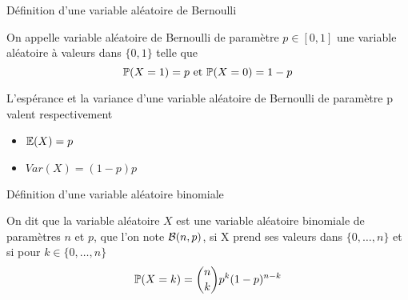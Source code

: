 


\begin{note}
  \begin{field}
    Définition d'une variable aléatoire de Bernoulli
  \end{field}
  \begin{field}
    On appelle variable aléatoire de Bernoulli de paramètre $p \in
    [0,1]$ une variable aléatoire à valeurs dans $\{0,1\}$ telle que
    $$\mathbb{P}(X=1)=p\text{ et }\mathbb{P}(X=0)=1-p$$
  \end{field}
  \begin{field}
  \end{field}
\end{note}


\begin{note}
  \begin{field}
    L'espérance et la variance d'une variable aléatoire de Bernoulli
    de paramètre p valent respectivement
  \end{field}
  \begin{field}
    \begin{itemize}
    \item $\mathbb{E}(X) = p$
    \item $Var(X) = (1-p)p$
    \end{itemize}

  \end{field}
  \begin{field}

  \end{field}
\end{note}

\begin{note}
  \begin{field}
    Définition d'une variable aléatoire binomiale
  \end{field}
  \begin{field}
    On dit que la variable aléatoire $X$ est une variable aléatoire
    binomiale de paramètres $n$ et $p$, que l'on note $\mathcal{B}(n,p)$, si X
    prend ses valeurs dans $\{0,\dots,n\}$ et si pour $k \in
    \{0,\dots,n\}$
    $$\mathbb{P}(X=k)=\binom{n}{k}p^k(1-p)^{n-k}$$
  \end{field}
  \begin{field}

  \end{field}
\end{note}

